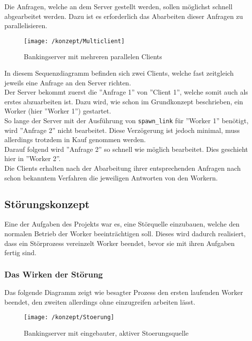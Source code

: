 Die Anfragen, welche an dem Server gestellt werden, sollen möglichst schnell abgearbeitet werden. Dazu ist es erforderlich das Abarbeiten dieser Anfragen zu parallelisieren.

\begin{figure}[H]
\centering
\texttt{[image: /konzept/Multiclient]}
\caption{Bankingserver mit mehreren parallelen Clients}
\label{fig:multiclient}
\end{figure}

In diesem Sequenzdiagramm befinden sich zwei Clients, welche fast zeitgleich jeweils eine Anfrage an den Server richten.\\
Der Server bekommt zuerst die ''Anfrage 1'' von ''Client 1'', welche somit auch als erstes abzuarbeiten ist. Dazu wird, wie schon im Grundkonzept beschrieben, ein Worker (hier ''Worker 1'') gestartet.\\
So lange der Server mit der Ausführung von \texttt{spawn\_link} für ''Worker 1'' benötigt, wird ''Anfrage 2'' nicht bearbeitet. Diese Verzögerung ist jedoch minimal, muss allerdings trotzdem in Kauf genommen werden.\\
Darauf folgend wird ''Anfrage 2'' so schnell wie möglich bearbeitet. Dies geschieht hier in ''Worker 2''.\\
Die Clients erhalten nach der Abarbeitung ihrer entsprechenden Anfragen nach schon bekanntem Verfahren die jeweiligen Antworten von den Workern.

\subsection{Störungskonzept}

Eine der Aufgaben des Projekts war es, eine Störquelle einzubauen, welche den normalen Betrieb der Worker beeinträchtigen soll. Dieses wird dadurch realisiert, dass ein Störprozess vereinzelt Worker beendet, bevor sie mit ihren Aufgaben fertig sind.\\

\subsubsection{Das Wirken der Störung}

Das folgende Diagramm zeigt wie besagter Prozess den ersten laufenden Worker beendet, den zweiten allerdings ohne einzugreifen arbeiten lässt.\\

\begin{figure}[H]
\centering
\texttt{[image: /konzept/Stoerung]}
\caption{Bankingserver mit eingebauter, aktiver Stoerungsquelle}
\label{fig:stoerung}
\end{figure}

